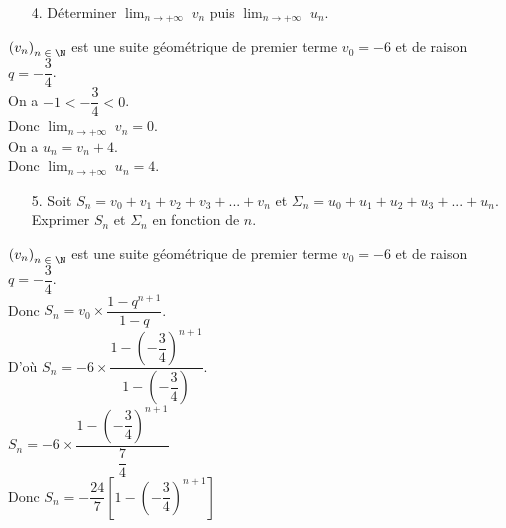 \vspace*{-1.8cm}

\begin{itemize}
\item[4.] Déterminer $ \displaystyle {\lim_{n \rightarrow +\infty}} \; v_n$ puis $ \displaystyle {\lim_{n \rightarrow +\infty}} \; u_n$. \\
\end{itemize}

$\left(v_n\right)_{n \; \in \; \N}$ est une suite géométrique de premier terme $v_0 = -6$ et de raison $q = -\dfrac{3}{4}$. \\

On a $-1 < -\dfrac{3}{4} < 0$. \\

Donc $ \displaystyle {\lim_{n \rightarrow +\infty}} \; v_n = 0$. \\

On a $u_n = v_n + 4$. \\

Donc $ \displaystyle {\lim_{n \rightarrow +\infty}} \; u_n = 4$. \\

\begin{itemize}
\item[5.] Soit $S_n = v_0 + v_1 + v_2 + v_3 + ... + v_n$ et $\Sigma_n = u_0 + u_1 + u_2 + u_3 + ... + u_n$. \\ Exprimer $S_n$ et $\Sigma_n$ en fonction de $n$. \\
\end{itemize}

$\left(v_n\right)_{n \; \in \; \N}$ est une suite géométrique de premier terme $v_0 = -6$ et de raison $q = -\dfrac{3}{4} $. \\

Donc $S_n = v_0 \times \dfrac{1 - q^{n+1}}{1 - q}$. \vspace*{.3cm} \\

D'où $S_n = -6 \times \dfrac{1 - \left(-\dfrac{3}{4}\right)^{n+1}}{1 - \left(-\dfrac{3}{4}\right)}$. \vspace*{.3cm} \\

$S_n = -6 \times \dfrac{1 - \left(-\dfrac{3}{4}\right)^{n+1}}{\dfrac{7}{4}}$ \vspace*{.3cm} \\

Donc $S_n = -\dfrac{24}{7} \left[1 - \left(-\dfrac{3}{4}\right)^{n+1}\right]$ \vspace*{.3cm} \\

